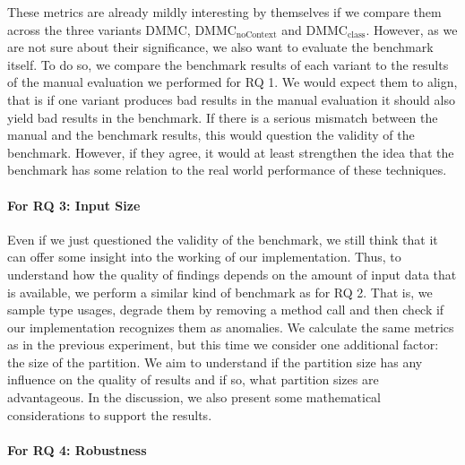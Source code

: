 These metrics are already mildly interesting by themselves if we compare them across the three variants $\text{DMMC}$, $\text{DMMC}_\text{noContext}$ and $\text{DMMC}_\text{class}$.
However, as we are not sure about their significance, we also want to evaluate the benchmark itself.
To do so, we compare the benchmark results of each variant to the results of the manual evaluation we performed for RQ 1.
We would expect them to align, that is if one variant produces bad results in the manual evaluation it should also yield bad results in the benchmark.
If there is a serious mismatch between the manual and the benchmark results, this would question the validity of the benchmark.
However, if they agree, it would at least strengthen the idea that the benchmark has some relation to the real world performance of these techniques.


\paragraph{For RQ 3: Input Size}

Even if we just questioned the validity of the benchmark, we still think that it can offer some insight into the working of our implementation.
Thus, to understand how the quality of findings depends on the amount of input data that is available, we perform a similar kind of benchmark as for RQ 2.
That is, we sample type usages, degrade them by removing a method call and then check if our implementation recognizes them as anomalies.
We calculate the same metrics as in the previous experiment, but this time we consider one additional factor: the size of the partition.
We aim to understand if the partition size has any influence on the quality of results and if so, what partition sizes are advantageous.
In the discussion, we also present some mathematical considerations to support the results.
    
\paragraph{For RQ 4: Robustness}

